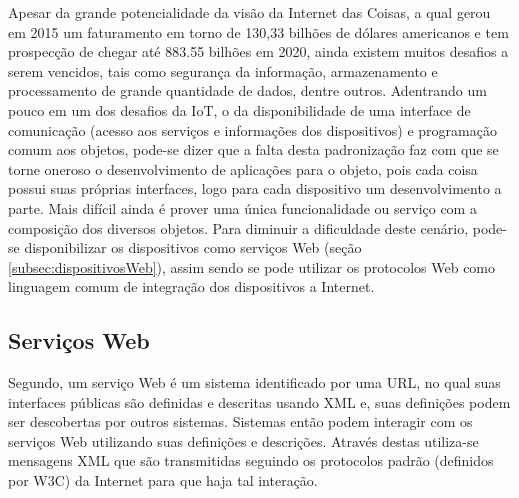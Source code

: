 Apesar da grande potencialidade da visão da Internet das Coisas, a qual gerou em 2015 um faturamento em torno de 130,33 bilhões de dólares americanos e tem prospecção de chegar até 883.55 bilhões em 2020\footnotemark {}, ainda existem muitos desafios a serem vencidos, tais como segurança da informação, armazenamento e processamento de grande quantidade de dados, dentre outros. Adentrando um pouco em um dos desafios da IoT, o da disponibilidade de uma interface de comunicação (acesso aos serviços e informações dos dispositivos) e programação comum aos objetos, pode-se dizer que a falta desta padronização faz com que se torne oneroso o desenvolvimento de aplicações para o objeto, pois cada coisa possui suas próprias interfaces, logo para cada dispositivo um desenvolvimento a parte. Mais difícil ainda é prover uma única funcionalidade ou serviço com a composição dos diversos objetos. Para diminuir a dificuldade deste cenário, pode-se disponibilizar os dispositivos como serviços Web (seção \ref{subsec:dispositivosWeb}), assim sendo se pode utilizar os protocolos Web como linguagem comum de integração dos dispositivos a Internet.\cite{Franca:2011}

\subsection{Serviços Web}
\label{ws:webservices}
Segundo\cite{Dustdar:2005}, um serviço Web é um sistema identificado por uma URL\footnotemark {}, no qual suas interfaces públicas são definidas e descritas usando XML\footnotemark {} e, suas definições podem ser descobertas por outros sistemas. Sistemas então podem interagir com os serviços Web utilizando suas definições e descrições. Através destas utiliza-se mensagens XML que são transmitidas seguindo os protocolos padrão (definidos por W3C\footnotemark {}) da Internet para que haja tal interação.


